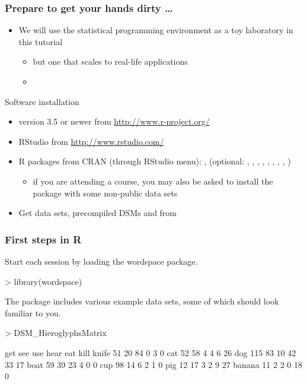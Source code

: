 \documentclass[t]{beamer} %
\begin{document}
\begin{frame}
  \frametitle{Prepare to get your hands dirty \ldots}
  
  \begin{itemize}
  \item We will use the statistical programming environment \href{http://www.r-project.org/}{} as a toy laboratory in this tutorial
    \begin{itemize}
    \item[\hand] but one that scales to real-life applications
    \item[]
    \end{itemize}
  \end{itemize}

  Software installation
  \begin{itemize}
  \item {} version 3.5 or newer from \url{http://www.r-project.org/}
  \item RStudio from \url{http://www.rstudio.com/}
  \item R packages from CRAN (through RStudio menu):
    ,  (optional: , , , , , , , , )
    \begin{itemize}
    \item if you are attending a course, you may also be asked to install the  package with some non-public data sets
    \end{itemize}
  \item Get data sets, precompiled DSMs and  from\\ 
  \end{itemize}
\end{frame}

\begin{frame}[fragile]
  \frametitle{First steps in R}

Start each session by loading the wordspace package.
\begin{Rcode}
> library(wordspace)
\end{Rcode}


The package includes various example data sets, some of which should look familiar to you.
\begin{Rcode}
> DSM_HieroglyphsMatrix\begin{Rout}
       get see use hear eat kill
knife   51  20  84    0   3    0
cat     52  58   4    4   6   26
dog    115  83  10   42  33   17
boat    59  39  23    4   0    0
cup     98  14   6    2   1    0
pig     12  17   3    2   9   27
banana  11   2   2    0  18    0
\end{Rout}
\end{Rcode}

\end{frame}
\end{document}

